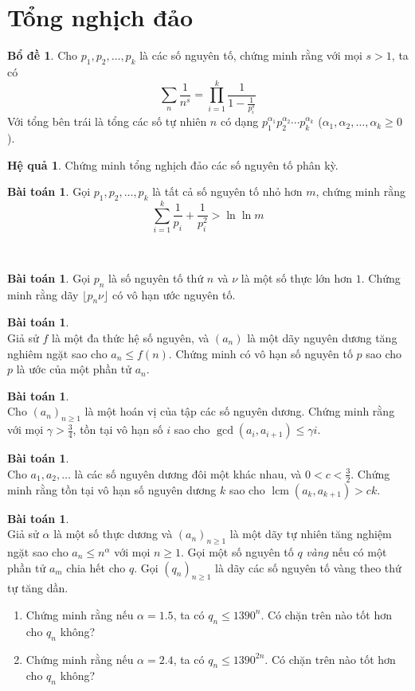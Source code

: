\documentclass{article}
\theoremstyle{definition}
\newtheorem{corollary}[theorem]{Hệ quả}
\newtheorem{lemma}[theorem]{Bổ đề}
\newtheorem{exercise}[theorem]{Bài toán}
\begin{document}
\section{Tổng nghịch đảo}
\begin{lemma}
Cho $p_1, p_2, \hdots, p_k$ là các số nguyên tố, chứng minh rằng với mọi $s > 1$, ta có
$$\sum_n \frac{1}{n^s} = \prod_{i = 1}^k \frac{1}{1 - \frac{1}{p_i^s}}$$
Với tổng bên trái là tổng các số tự nhiên $n$ có dạng $p_1^{\alpha_1} p_2^{\alpha_2} \cdots p_k^{\alpha_k}$ ($\alpha_1, \alpha_2, \hdots, \alpha_k \geq 0$).
\end{lemma}
\begin{corollary} \label{sum-reciprocal-prime-diverge}
Chứng minh tổng nghịch đảo các số nguyên tố phân kỳ.
\end{corollary}
\begin{exercise}
Gọi $p_1, p_2, \hdots, p_k$ là tất cả số nguyên tố nhỏ hơn $m$, chứng minh rằng
$$\sum_{i = 1}^k \frac{1}{p_i} + \frac{1}{p_i^2} > \ln \ln m$$
\end{exercise}
\ \\
\begin{exercise}
Gọi $p_n$ là số nguyên tố thứ $n$ và $\nu$ là một số thực lớn hơn $1$. Chứng minh rằng dãy $\lfloor p_n \nu \rfloor$ có vô hạn ước nguyên tố.
\end{exercise}
\begin{exercise} \ \\
Giả sử $f$ là một đa thức hệ số nguyên, và $(a_n)$ là một dãy nguyên dương tăng nghiêm ngặt sao cho $a_n \leq f(n)$. Chứng minh có vô hạn số nguyên tố $p$ sao cho $p$ là ước của một phần tử $a_n$.
\end{exercise}
\begin{exercise} \ \\
Cho $(a_n)_{n \geq 1}$ là một hoán vị của tập các số nguyên dương. Chứng minh rằng với mọi $\gamma > \frac{3}{4}$, tồn tại vô hạn số $i$ sao cho $\gcd(a_i, a_{i + 1}) \leq \gamma i$.
\end{exercise}
\begin{exercise} \ \\
Cho $a_1, a_2, \hdots$ là các số nguyên dương đôi một khác nhau, và $0 < c < \frac{3}{2}$. Chứng minh rằng tồn tại vô hạn số nguyên dương $k$ sao cho $\operatorname{lcm}(a_k, a_{k + 1}) > ck$.
\end{exercise}
\begin{exercise} \ \\
Giả sử $\alpha$ là một số thực dương và $(a_n)_{n \geq 1}$ là một dãy tự nhiên tăng nghiệm ngặt sao cho $a_n \leq n^\alpha$ với mọi $n \geq 1$. Gọi một số nguyên tố $q$ \textit{vàng} nếu có một phần tử $a_m$ chia hết cho $q$. Gọi $(q_n)_{n \geq 1}$ là dãy các số nguyên tố vàng theo thứ tự tăng dần.
\begin{enumerate}
	\item Chứng minh rằng nếu $\alpha = 1.5$, ta có $q_n \leq 1390^n$. Có chặn trên nào tốt hơn cho $q_n$ không?
	\item Chứng minh rằng nếu $\alpha = 2.4$, ta có $q_n \leq 1390^{2n}$. Có chặn trên nào tốt hơn cho $q_n$ không?
\end{enumerate}
\end{exercise}
\end{document}
